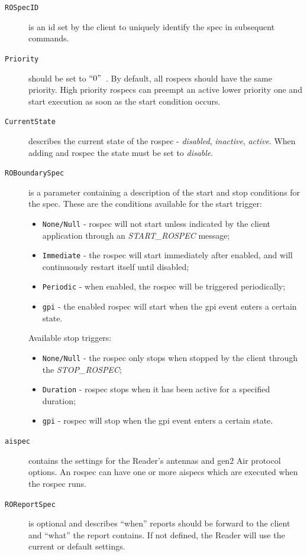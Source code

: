 \begin{description}

\item[\texttt{ROSpecID}] is an \ac{id} set by the client to uniquely identify the \ac{spec} in subsequent commands.

\item[\texttt{Priority}] should be set to $``0"$~\cite{ImpinjLTKProgrammers}. By default, all \acp{rospec} should have the same priority. High priority \acp{rospec} can preempt an active lower priority one and start execution as soon as the start condition occurs.

\item[\texttt{CurrentState}] describes the current state of the \ac{rospec} - \emph{disabled}, \emph{inactive}, \emph{active}. When adding and \ac{rospec} the state must be set to \emph{disable}.

\item[\texttt{ROBoundarySpec}] is a parameter containing a description of the start and stop conditions for the \ac{spec}. 
These are the conditions available for the start trigger:
\begin{itemize}
    \item \texttt{None/Null} - \ac{rospec} will not start unless indicated by the client application through an \textit{START\_ROSPEC} message;
    \item \texttt{Immediate} - the \ac{rospec} will start immediately after enabled, and will continuously restart itself until disabled;
    \item \texttt{Periodic} - when enabled, the \ac{rospec} will be triggered periodically;
    \item \texttt{\ac{gpi}} - the enabled \ac{rospec} will start when the \ac{gpi} event enters a certain state.
\end{itemize}

Available stop triggers:
\begin{itemize}
    \item \texttt{None/Null} - the \ac{rospec} only stops when stopped by the client through the \textit{STOP\_ROSPEC};
    \item \texttt{Duration} - \ac{rospec} stops when it has been active for a specified duration;
    \item \texttt{\ac{gpi}} - \ac{rospec} will stop when the \ac{gpi} event enters a certain state.
\end{itemize}

\item[\texttt{\ac{aispec}}] contains the settings for the Reader's antennas and \ac{gen2} Air protocol options. An \ac{rospec} can have one or more \acp{aispec} which are executed when the \ac{rospec} runs.

\item[\texttt{ROReportSpec}] is optional and describes ``when'' reports should be forward to the client and ``what'' the report contains. If not defined, the Reader will use the current or default settings.
\end{description}

